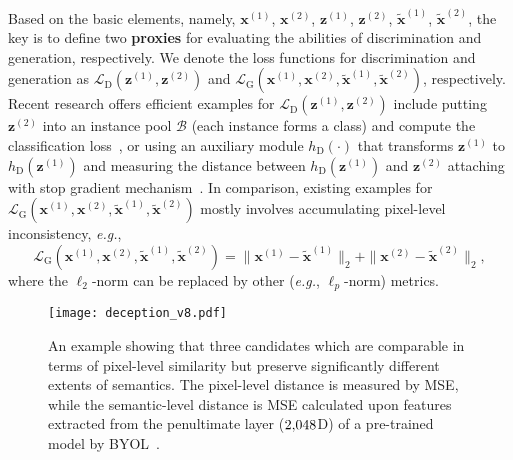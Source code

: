 \documentclass[10pt,twocolumn,letterpaper]{article}
\begin{document}
Based on the basic elements, namely, $\mathbf{x}^{(1)}$, $\mathbf{x}^{(2)}$, $\mathbf{z}^{(1)}$, $\mathbf{z}^{(2)}$, $\tilde{\mathbf{x}}^{(1)}$, $\tilde{\mathbf{x}}^{(2)}$, the key is to define two \textbf{proxies} for evaluating the abilities of discrimination and generation, respectively. We denote the loss functions for discrimination and generation as $\mathcal{L}_\mathrm{D}(\mathbf{z}^{(1)},\mathbf{z}^{(2)})$ and $\mathcal{L}_\mathrm{G}(\mathbf{x}^{(1)},\mathbf{x}^{(2)},\tilde{\mathbf{x}}^{(1)},\tilde{\mathbf{x}}^{(2)})$, respectively. Recent research offers efficient examples for $\mathcal{L}_\mathrm{D}(\mathbf{z}^{(1)},\mathbf{z}^{(2)})$ include putting $\mathbf{z}^{(2)}$ into an instance pool $\mathcal{B}$ (each instance forms a class) and compute the classification loss~\cite{chen2020simple,he2020momentum}, or using an auxiliary module $h_\mathrm{D}(\cdot)$ that transforms $\mathbf{z}^{(1)}$ to $h_\mathrm{D}(\mathbf{z}^{(1)})$ and measuring the distance between $h_\mathrm{D}(\mathbf{z}^{(1)})$ and $\mathbf{z}^{(2)}$ attaching with stop gradient mechanism~\cite{grill2020bootstrap, chen2020improved}. In comparison, existing examples for $\mathcal{L}_\mathrm{G}(\mathbf{x}^{(1)},\mathbf{x}^{(2)},\tilde{\mathbf{x}}^{(1)},\tilde{\mathbf{x}}^{(2)})$ mostly involves accumulating pixel-level inconsistency, \textit{e.g.},
\begin{equation}
\label{eqn:pixel-level}
\mathcal{L}_\mathrm{G}(\mathbf{x}^{(1)},\mathbf{x}^{(2)},\tilde{\mathbf{x}}^{(1)},\tilde{\mathbf{x}}^{(2)})=\|\mathbf{x}^{(1)}-\tilde{\mathbf{x}}^{(1)}\|_2+\|\mathbf{x}^{(2)}-\tilde{\mathbf{x}}^{(2)}\|_2,
\end{equation}
where the $\ell_2$-norm can be replaced by other (\textit{e.g.}, $\ell_p$-norm) metrics.

\begin{figure}[!t]
\centering
\texttt{[image: deception\_v8.pdf]}
\caption{An example showing that three candidates which are comparable in terms of pixel-level similarity but preserve significantly different extents of semantics. The pixel-level distance is measured by MSE, while the semantic-level distance is MSE calculated upon features extracted from the penultimate layer ($2\rm{,}048$D) of a pre-trained model by BYOL~\cite{grill2020bootstrap}.}
\label{fig:pixel-level}
\end{figure}
\end{document}
